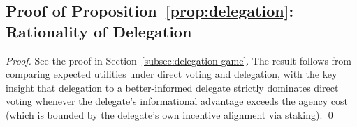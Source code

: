 \subsection{Proof of Proposition~\ref{prop:delegation}: Rationality of Delegation}

\begin{proof}
See the proof in Section~\ref{subsec:delegation-game}. The result follows
from comparing expected utilities under direct voting and delegation, with the
key insight that delegation to a better-informed delegate strictly dominates
direct voting whenever the delegate's informational advantage exceeds the
agency cost (which is bounded by the delegate's own incentive alignment via
\veCORTEX{} staking). \qed
\end{proof}

